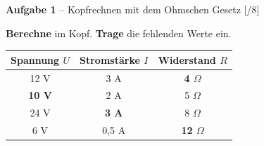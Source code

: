 \documentclass[11pt, a4paper]{article}
\newif\ifzeigesternchen
\newcommand{\lsg}[1]{\textcolor{loesung}{\textbf{#1}}}
\newcommand{\punktebox}[1]{\hfill\small\textcolor{mittelgrau}{[\hspace{0.8em}/#1]}}
\newcommand{\stern}[1]{\ifzeigesternchen\textsuperscript{\textcolor{fachfarbe}{(#1)}}\fi}
\newcommand{\aufgabe}[2]{%
    \needspace{4\baselineskip}%
    \vspace{8pt}%
    \noindent\textbf{\textcolor{fachfarbe}{Aufgabe #1}} #2%
    \vspace{4pt}%
    \nopagebreak[4]%
}
\newcommand{\operator}[1]{\textbf{#1}}
\begin{document}

\aufgabe{1}{\stern{*} – Kopfrechnen mit dem Ohmschen Gesetz} \punktebox{8}

\operator{Berechne} im Kopf. \operator{Trage} die fehlenden Werte ein.

\vspace{0.5em}
\begin{center}
\begin{tabular}{|c|c|c|}
\hline
\textbf{Spannung $U$} & \textbf{Stromstärke $I$} & \textbf{Widerstand $R$} \\
\hline
12 V & 3 A & \lsg{4 $\Omega$} \\[0.5em]
\hline
\lsg{10 V} & 2 A & 5 $\Omega$ \\[0.5em]
\hline
24 V & \lsg{3 A} & 8 $\Omega$ \\[0.5em]
\hline
6 V & 0,5 A & \lsg{12 $\Omega$} \\[0.5em]
\hline
\end{tabular}
\end{center}

\end{document}
